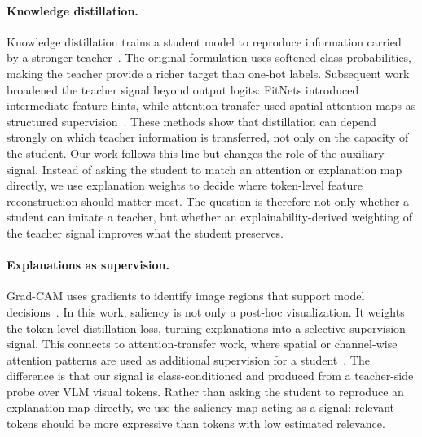 \paragraph{Knowledge distillation.}
Knowledge distillation trains a student model to reproduce information carried by a stronger teacher~\citep{hinton2015distilling}.
The original formulation uses softened class probabilities, making the teacher provide a richer target than one-hot labels.
Subsequent work broadened the teacher signal beyond output logits: FitNets introduced intermediate feature hints, while attention transfer used spatial attention maps as structured supervision~\citep{romero2015fitnets,zagoruyko2017attention}.
These methods show that distillation can depend strongly on which teacher information is transferred, not only on the capacity of the student.
Our work follows this line but changes the role of the auxiliary signal.
Instead of asking the student to match an attention or explanation map directly, we use explanation weights to decide where token-level feature reconstruction should matter most.
The question is therefore not only whether a student can imitate a teacher, but whether an explainability-derived weighting of the teacher signal improves what the student preserves.

\paragraph{Explanations as supervision.}
Grad-CAM uses gradients to identify image regions that support model decisions~\citep{selvaraju2017gradcam}.
In this work, saliency is not only a post-hoc visualization.
It weights the token-level distillation loss, turning explanations into a selective supervision signal.
This connects to attention-transfer work, where spatial or channel-wise attention patterns are used as additional supervision for a student~\citep{zagoruyko2017attention}.
The difference is that our signal is class-conditioned and produced from a teacher-side probe over VLM visual tokens.
Rather than asking the student to reproduce an explanation map directly, we use the saliency map acting as a signal: relevant tokens should be more expressive than tokens with low estimated relevance.
